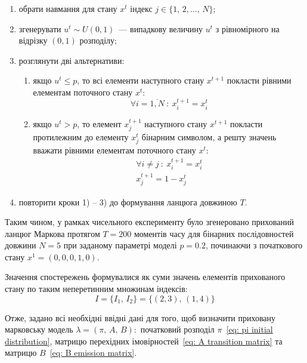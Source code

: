 \newpage
\begin{enumerate}
    \item обрати навмання для стану $x^t$ індекс $j \in \{ 1,\,2,\ldots,\,N \}$;
    \item згенерувати $u^t \sim U(0,1)$~--- випадкову величину $u^t$ з рівномірного на відрізку $(0,1)$ розподілу;
    \item розглянути дві альтернативи:
    \begin{enumerate} 
        \item якщо $u^t \leqslant p$, то всі елементи наступного стану $x^{t+1}$ покласти рівними елементам поточного стану $x^{t}:$
        \begin{equation*}
            \forall i=\overline{1,N}\ :\ x^{t+1}_i=x^{t}_i
        \end{equation*}
        \item якщо $u^t > p$, то елемент $x^{t+1}_j$ наступного стану $x^{t+1}$ покласти протилежним до елементу $x^{t}_j$ бінарним символом, а решту значень вважати рівними елементам поточного стану $x^{t}:$
        \begin{gather*}
            \forall i \neq j\ :\ x^{t+1}_i=x^{t}_i \\
            x^{t+1}_j=1 - x^{t}_j
        \end{gather*}
    \end{enumerate}
    \item повторити кроки 1) -- 3) до формування ланцюга довжиною $T$.
\end{enumerate}

Таким чином, у рамках чисельного експерименту було згенеровано прихований ланцюг Маркова протягом $T=200$ моментів часу для бінарних послідовностей довжини $N=5$ при заданому параметрі моделі $p=0.2$, починаючи з початкового стану $x^1=(0,0,0,1,0)$. 

Значення спостережень формувалися як суми значень елементів прихованого стану по таким неперетинним множинам індексів:
\begin{equation}\label{eq: example observed indexes}
    I=\{I_1,\,I_2\}=\{(2,3),\,(1,4)\}
\end{equation} 

Отже, задано всі необхідні ввідні дані для того, щоб визначити приховану марковську модель $\lambda=\left( \pi,\,A,\,B \right):$ початковий розподіл $\pi$~\eqref{eq: pi initial distribution}, матрицю перехідних імовірностей~\eqref{eq: A transition matrix} та матрицю $B$~\eqref{eq: B emission matrix}.

